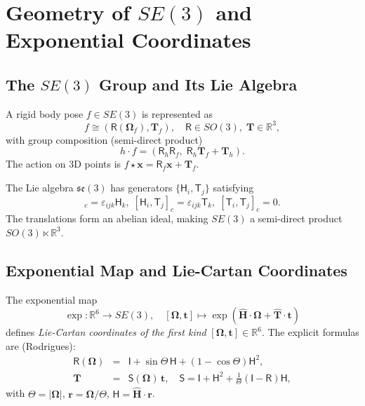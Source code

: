 \documentclass[journal]{IEEEtran}
\newcommand{\real}{\mathbb{R}}
\newcommand{\bfOmega}{\boldsymbol{\Omega}}
\newcommand{\beq}{\begin{equation}}
\newcommand{\eeq}{\end{equation}}
\newcommand{\beqar}{\begin{eqnarray}}
\newcommand{\eeqar}{\end{eqnarray}}
\begin{document}
\section{Geometry of $SE(3)$ and Exponential Coordinates}
\label{sec:SE3geometry}

\subsection{The $SE(3)$ Group and Its Lie Algebra}

A rigid body pose $f \in SE(3)$ is represented as
\beq
    f \cong (\mathsf{R}(\bfOmega_f), \mathbf{T}_f),\quad
    \mathsf{R} \in SO(3),\; \mathbf{T} \in \real^3,
    \label{eq:SE3element}
\eeq
with group composition (semi-direct product)
\beq
    h \cdot f = (\mathsf{R}_h \mathsf{R}_f,\; \mathsf{R}_h \mathbf{T}_f + \mathbf{T}_h).
    \label{eq:groupcomp}
\eeq
The action on 3D points is $f \star \mathbf{x} = \mathsf{R}_f \mathbf{x} + \mathbf{T}_f$.

The Lie algebra $\mathfrak{se}(3)$ has generators 
$\{\mathsf{H}_i, \mathsf{T}_j\}$ satisfying
\beq
    [\mathsf{H}_i, \mathsf{H}_j]_c = \varepsilon_{ijk}\mathsf{H}_k,\;
    [\mathsf{H}_i, \mathsf{T}_j]_c = \varepsilon_{ijk}\mathsf{T}_k,\;
    [\mathsf{T}_i, \mathsf{T}_j]_c = 0.
    \label{eq:sealgebra}
\eeq
The translations form an abelian ideal, making $SE(3)$ a 
semi-direct product $SO(3) \ltimes \real^3$.

\subsection{Exponential Map and Lie-Cartan Coordinates}

The exponential map
\beq
    \exp: \real^6 \to SE(3),\quad
    [\bfOmega, \mathbf{t}] \mapsto 
    \exp(\hat{\mathbf{H}} \cdot \bfOmega + \hat{\mathbf{T}} \cdot \mathbf{t})
    \label{eq:expmap}
\eeq
defines \emph{Lie-Cartan coordinates of the first kind} 
$[\bfOmega, \mathbf{t}] \in \real^6$.
The explicit formulas are (Rodrigues):
\beqar
    \mathsf{R}(\bfOmega) &=& \mathsf{I} + \sin\Theta\, \mathsf{H} 
    + (1-\cos\Theta)\mathsf{H}^2, \label{eq:rodrigues} \\
    \mathbf{T} &=& \mathsf{S}(\bfOmega)\, \mathbf{t},\quad
    \mathsf{S} = \mathsf{I} + \mathsf{H}^2 + 
    \frac{1}{\Theta}(\mathsf{I} - \mathsf{R})\mathsf{H}, \nonumber
\eeqar
with $\Theta = |\bfOmega|$, $\mathbf{r} = \bfOmega/\Theta$, 
$\mathsf{H} = \hat{\mathbf{H}} \cdot \mathbf{r}$.
\end{document}
